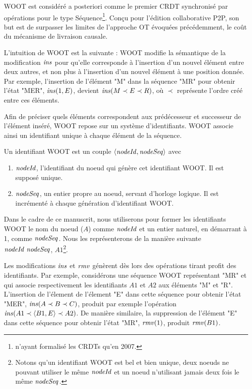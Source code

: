 WOOT \cite{2006-woot-oster} est considéré a posteriori comme le premier \ac{CRDT} synchronisé par opérations pour le type Séquence\footnote{\cite{2007-crdt-shapiro} n'ayant formalisé les \acp{CRDT} qu'en 2007.}.
Conçu pour l'édition collaborative \ac{P2P}, son but est de surpasser les limites de l'approche \ac{OT} évoquées précédemment, \ie le coût du mécanisme de livraison causale.

L'intuition de WOOT est la suivante : WOOT modifie la sémantique de la modification $\mathit{ins}$ pour qu'elle corresponde à l'insertion d'un nouvel élément entre deux autres, et non plus à l'insertion d'un nouvel élément à une position donnée.
Par exemple, l'insertion de l'élément "M" dans la séquence "MR" pour obtenir l'état "MER", \ie $\mathit{ins}(1, E)$, devient $\mathit{ins}(M \prec E \prec R)$, où $\prec$ représente l'ordre créé entre ces éléments.

Afin de préciser quels éléments correspondent aux prédécesseur et successeur de l'élément inséré, WOOT repose sur un système d'identifiants.
WOOT associe ainsi un identifiant unique à chaque élément de la séquence.
\begin{definition}
  \label{def:dot}
  Un identifiant WOOT est un couple $\langle \mathit{nodeId}, \mathit{nodeSeq} \rangle$ avec
  \begin{enumerate}
    \item $\mathit{nodeId}$, l'identifiant du noeud qui génère cet identifiant WOOT.
      Il est supposé unique.
    \item $\mathit{nodeSeq}$, un entier propre au noeud, servant d'horloge logique.
      Il est incrémenté à chaque génération d'identifiant WOOT.
  \end{enumerate}
\end{definition}
Dans le cadre de ce manuscrit, nous utiliserons pour former les identifiants WOOT le nom du noeud (\eg $A$) comme $\mathit{nodeId}$ et un entier naturel, en démarrant à 1, comme $\mathit{nodeSeq}$.
Nous les représenterons de la manière suivante $\mathit{nodeId}~\mathit{nodeSeq}$, \eg $A1$\footnote{Notons qu'un identifiant WOOT est bel et bien unique, deux noeuds ne pouvant utiliser le même $\mathit{nodeId}$ et un noeud n'utilisant jamais deux fois le même $\mathit{nodeSeq}$.}.

Les modifications $\mathit{ins}$ et $\mathit{rmv}$ génèrent dès lors des opérations tirant profit des identifiants.
Par exemple, considérons une séquence WOOT représentant "MR" et qui associe respectivement les identifiants $A1$ et $A2$ aux éléments "M" et "R".
L'insertion de l'élement de l'élement "E" dans cette séquence pour obtenir l'état "MER", \ie $\mathit{ins}(A \prec B \prec C)$, produit par exemple l'opération $\mathit{ins}(A1 \prec \langle B1,E \rangle \prec A2)$.
De manière similaire, la suppression de l'élément "E" dans cette séquence pour obtenir l'état "MR", \ie $\mathit{rmv}(1)$, produit $\mathit{rmv}(B1)$.


